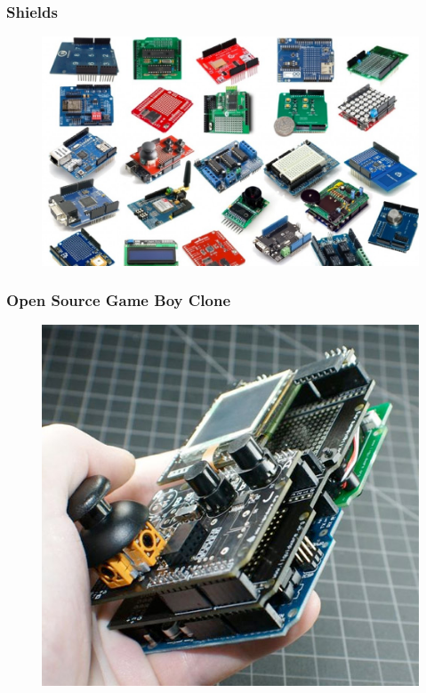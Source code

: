 
\begin{frame}
	\frametitle{Shields}
	\begin{figure}
		\includegraphics[scale=.28]{assets/shields} 
	\end{figure}
\end{frame}

\begin{frame}
	\frametitle{Open Source Game Boy Clone}
	\begin{figure}
		\includegraphics[scale=.32]{assets/gameboy} 
	\end{figure}
\end{frame}

